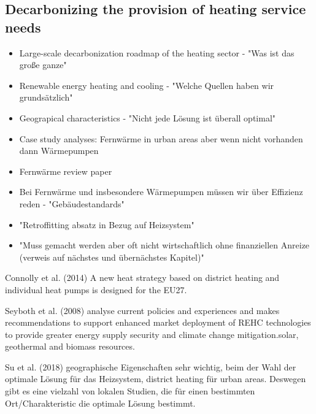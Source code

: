 \subsection{Decarbonizing the provision of heating service needs}
\begin{itemize}
	\item[\textcolor{col}{\textbullet}] \textcolor{col}{Large-scale decarbonization roadmap of the heating sector - "Was ist das große ganze"}
	\item[\textcolor{col}{\textbullet}] \textcolor{col}{Renewable energy heating and cooling - "Welche Quellen haben wir grundsätzlich"}
	\item[\textcolor{col}{\textbullet}] \textcolor{col}{Geograpical characteristics - "Nicht jede Lösung ist überall optimal"}
	\item[\textcolor{col}{\textbullet}] \textcolor{col}{Case study analyses: Fernwärme in urban areas aber wenn nicht vorhanden dann Wärmepumpen}
	\item[\textcolor{col}{\textbullet}] \textcolor{col}{Fernwärme review paper}
	\item[\textcolor{col}{\textbullet}] \textcolor{col}{Bei Fernwärme und insbesondere Wärmepumpen müssen wir über Effizienz reden - "Gebäudestandards"}
	\item[\textcolor{col}{\textbullet}] \textcolor{col}{"Retroffitting absatz in Bezug auf Heizsystem"}
	\item[\textcolor{col}{\textbullet}] \textcolor{col}{"Muss gemacht werden aber oft nicht wirtschaftlich ohne finanziellen Anreize (verweis auf nächstes und übernächstes Kapitel)"}
\end{itemize}

Connolly et al. (2014) \cite{connolly2014heat} A new heat strategy based on district heating and individual heat pumps is designed for the EU27.

Seyboth et al. (2008) \cite{seyboth2008recognising} analyse current policies and experiences and makes recommendations to support enhanced market deployment of REHC technologies to provide greater energy supply security and climate change mitigation.solar, geothermal and biomass resources.

Su et al. (2018) \cite{su2018heating} geographische Eigenschaften sehr wichtig, beim der Wahl der optimale Lösung für das Heizsystem, district heating für urban areas.
Deswegen gibt es eine vielzahl von lokalen Studien, die für einen bestimmten Ort/Charakteristic die optimale Lösung bestimmt. 

